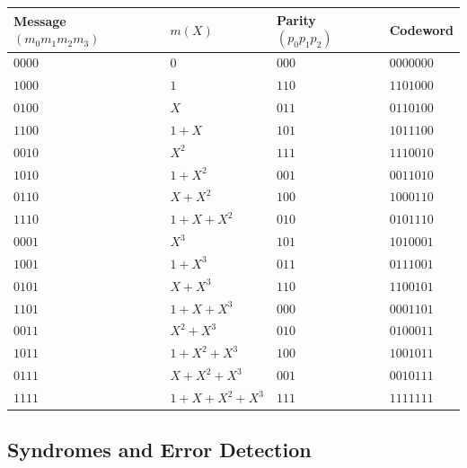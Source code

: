 \begin{example}
\begin{center}
\renewcommand{\arraystretch}{1.1}
\begin{tabular}{@{}p{3cm}lp{2.5cm}l@{}}
	\toprule
	Message \((m_0m_1m_2m_3)\) & \(m(X)\) & Parity \((p_0p_1p_2)\) & Codeword \\
	\midrule
	\(0000\) & \(0\) & \(000\) & \(0000000\) \\
	\(1000\) & \(1\) & \(110\) & \(1101000\) \\
	\(0100\) & \(X\) & \(011\) & \(0110100\) \\
	\(1100\) & \(1+X\) & \(101\) & \(1011100\) \\
	\(0010\) & \(X^2\) & \(111\) & \(1110010\) \\
	\(1010\) & \(1+X^2\) & \(001\) & \(0011010\) \\
	\(0110\) & \(X+X^2\) & \(100\) & \(1000110\) \\
	\(1110\) & \(1+X+X^2\) & \(010\) & \(0101110\) \\
	\(0001\) & \(X^3\) & \(101\) & \(1010001\) \\
	\(1001\) & \(1+X^3\) & \(011\) & \(0111001\) \\
	\(0101\) & \(X+X^3\) & \(110\) & \(1100101\) \\
	\(1101\) & \(1+X+X^3\) & \(000\) & \(0001101\) \\
	\(0011\) & \(X^2+X^3\) & \(010\) & \(0100011\) \\
	\(1011\) & \(1+X^2+X^3\) & \(100\) & \(1001011\) \\
	\(0111\) & \(X+X^2+X^3\) & \(001\) & \(0010111\) \\
	\(1111\) & \(1+X+X^2+X^3\) & \(111\) & \(1111111\) \\
	\bottomrule
\end{tabular}
\end{center}
\end{example}

\newpage
\subsection{Syndromes and Error Detection}


